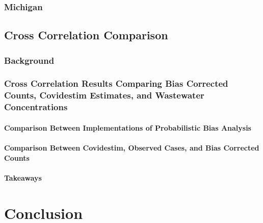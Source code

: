 \documentclass[12pt,twoside]{smiththesis}
\begin{document}
\hypertarget{michigan}{%
\subsection{Michigan}\label{michigan}}

\hypertarget{cross-correlation-comparison}{%
\section{Cross Correlation Comparison}\label{cross-correlation-comparison}}

\hypertarget{background-1}{%
\subsection{Background}\label{background-1}}

\hypertarget{cross-correlation-results-comparing-bias-corrected-counts-covidestim-estimates-and-wastewater-concentrations}{%
\subsection{Cross Correlation Results Comparing Bias Corrected Counts, Covidestim Estimates, and Wastewater Concentrations}\label{cross-correlation-results-comparing-bias-corrected-counts-covidestim-estimates-and-wastewater-concentrations}}

\hypertarget{comparison-between-implementations-of-probabilistic-bias-analysis}{%
\subsubsection{Comparison Between Implementations of Probabilistic Bias Analysis}\label{comparison-between-implementations-of-probabilistic-bias-analysis}}

\hypertarget{comparison-between-covidestim-observed-cases-and-bias-corrected-counts}{%
\subsubsection{Comparison Between Covidestim, Observed Cases, and Bias Corrected Counts}\label{comparison-between-covidestim-observed-cases-and-bias-corrected-counts}}

\hypertarget{takeaways}{%
\subsubsection{Takeaways}\label{takeaways}}

\hypertarget{conclusion}{%
\chapter{Conclusion}\label{conclusion}}
\end{document}
